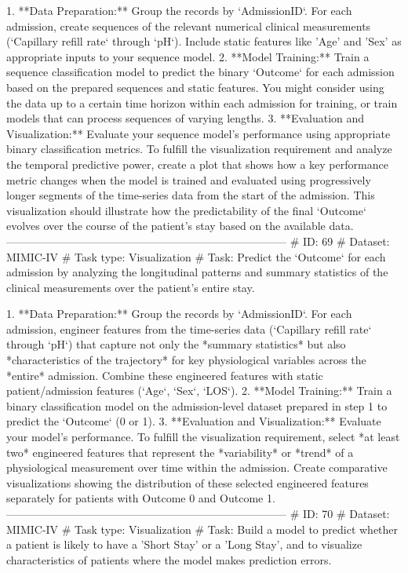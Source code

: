 \begin{tcolorbox}[colback=cadmiumgreen!5!white,colframe=forestgreen!75!white,breakable,title=\textit{Generated analytical tasks in task 4.}]
\begin{VerbatimWrap}
 1. **Data Preparation:** Group the records by `AdmissionID`. For each admission, create sequences of the relevant numerical clinical measurements (`Capillary refill rate` through `pH`). Include static features like 'Age' and 'Sex' as appropriate inputs to your sequence model.
 2. **Model Training:** Train a sequence classification model to predict the binary `Outcome` for each admission based on the prepared sequences and static features. You might consider using the data up to a certain time horizon within each admission for training, or train models that can process sequences of varying lengths.
 3. **Evaluation and Visualization:** Evaluate your sequence model's performance using appropriate binary classification metrics. To fulfill the visualization requirement and analyze the temporal predictive power, create a plot that shows how a key performance metric changes when the model is trained and evaluated using progressively longer segments of the time-series data from the start of the admission. This visualization should illustrate how the predictability of the final `Outcome` evolves over the course of the patient's stay based on the available data.
-----------------------------------------------------------------------------
# ID: 69  
# Dataset: MIMIC-IV 
# Task type: Visualization
# Task: Predict the `Outcome` for each admission by analyzing the longitudinal patterns and summary statistics of the clinical measurements over the patient's entire stay.
 
 1. **Data Preparation:** Group the records by `AdmissionID`. For each admission, engineer features from the time-series data (`Capillary refill rate` through `pH`) that capture not only the *summary statistics* but also *characteristics of the trajectory* for key physiological variables across the *entire* admission. Combine these engineered features with static patient/admission features (`Age`, `Sex`, `LOS`).
 2. **Model Training:** Train a binary classification model on the admission-level dataset prepared in step 1 to predict the `Outcome` (0 or 1).
 3. **Evaluation and Visualization:** Evaluate your model's performance. To fulfill the visualization requirement, select *at least two* engineered features that represent the *variability* or *trend* of a physiological measurement over time within the admission. Create comparative visualizations showing the distribution of these selected engineered features separately for patients with Outcome 0 and Outcome 1.
-----------------------------------------------------------------------------
# ID: 70  
# Dataset: MIMIC-IV 
# Task type: Visualization
# Task: Build a model to predict whether a patient is likely to have a 'Short Stay' or a 'Long Stay', and to visualize characteristics of patients where the model makes prediction errors.
 

\end{VerbatimWrap}
\end{tcolorbox}
